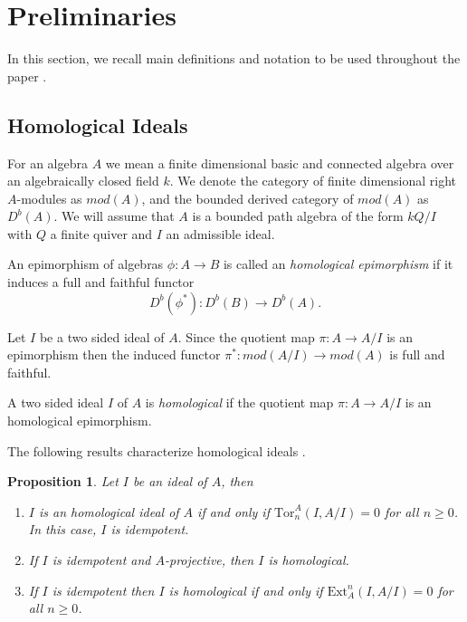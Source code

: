 \documentclass[10pt,twoside]{article}
\newtheorem{prop}{Proposition}
\theoremstyle{definition}
\begin{document}
\section{Preliminaries}
In this section, we recall main definitions and notation to be used throughout the paper \cite{Green, Auslander, Sierra, JAP,Armenta}.

\subsection{Homological Ideals}

For an algebra $A$ we mean a finite dimensional basic and connected algebra over an algebraically closed field $k$. We denote the category of finite dimensional right $A$-modules as $mod(A)$, and the bounded derived category of $mod(A)$ as $D^b(A)$. We will assume that $A$ is a bounded path algebra of the form $kQ/{I}$ with $Q$ a finite quiver and $I$ an admissible ideal.


\par\bigskip
An epimorphism of algebras $\phi:A \to B$ is called an \textit{homological epimorphism} if it induces a full and faithful functor
\[D^b(\phi^*) : D^b(B) \to D^b(A).\]

Let $I$ be a two sided ideal of $A$. Since the quotient map $\pi:A \to A/I$ is an epimorphism then the induced functor $\pi^*:mod(A/I)\to mod(A)$ is full and faithful.
\par\bigskip

A two sided ideal $I$ of $A$ is \textit{homological} if the quotient map $\pi:A\to A/I$ is an homological epimorphism.

\par\bigskip


The following results characterize homological ideals \cites{Auslander, JAP}.

\begin{prop}\label{JAP} Let $I$ be an ideal of $A$, then
\begin{enumerate}
\item $I$ is an homological ideal of $A$ if and only if $\mathrm{Tor}_n^A(I,A/I)=0$ for all $n\geq0$. In this case, $I$ is idempotent.

\item If $I$ is idempotent and $A$-projective, then $I$ is homological.

\item If $I$ is idempotent then $I$ is homological if and only if $\mathrm{Ext}^{n}_{A}(I,A/I)=0$ for all $n\geq0$.
\end{enumerate}

\end{prop}
\end{document}

